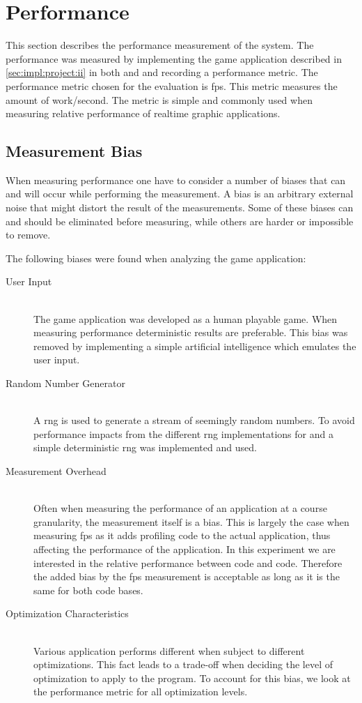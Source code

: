 \section{Performance}

This section describes the performance measurement of the system.
The performance was measured by implementing the game application described in \autoref{sec:impl:project:ii} in both {\C} and {\rust} and recording a performance metric.
The performance metric chosen for the evaluation is \gls{fps}.
This metric measures the amount of work/second.
The metric is simple and commonly used when measuring relative performance of realtime graphic applications.

\subsection{Measurement Bias}
\label{sec:perf:bias}

When measuring performance one have to consider a number of biases that can and will occur while performing the measurement.
A bias is an arbitrary external noise that might distort the result of the measurements.
Some of these biases can and should be eliminated before measuring, while others are harder or impossible to remove.

The following biases were found when analyzing the game application:
\begin{description}
  \item [User Input] \hfill \\
The game application was developed as a human playable game.
When measuring performance deterministic results are preferable.
This bias was removed by implementing a simple artificial intelligence which emulates the user input.

  \item [Random Number Generator] \hfill \\
A \gls{rng} is used to generate a stream of seemingly random numbers.
To avoid performance impacts from the different \gls{rng} implementations for {\C} and {\rust} a simple deterministic \gls{rng} was implemented and used.

  \item [Measurement Overhead] \hfill \\
Often when measuring the performance of an application at a course granularity, the measurement itself is a bias.
This is largely the case when measuring \gls{fps} as it adds profiling code to the actual application, thus affecting the performance of the application.
In this experiment we are interested in the relative performance between {\C} code and {\rust} code.
Therefore the added bias by the \gls{fps} measurement is acceptable as long as it is the same for both code bases.

  \item [Optimization Characteristics] \hfill \\
Various application performs different when subject to different optimizations.
This fact leads to a trade-off when deciding the level of optimization to apply to the program.
To account for this bias, we look at the performance metric for all optimization levels.
\end{description}

